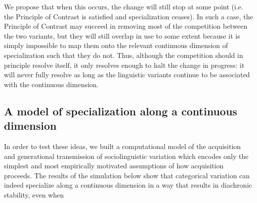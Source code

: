 We propose that when this occurs, the change will still stop at some point (i.e. the Principle of Contrast is satisfied and specialization ceases).
In such a case, the Principle of Contrast may succeed in removing most of the competition between the two variants, but they will still overlap in use to some extent because it is simply impossible to map them onto the relevant continuous dimension of specialization such that they do not.
Thus, although the competition should in principle resolve itself, it only resolves enough to halt the change in progress: it will never fully resolve as long as the linguistic variants continue to be associated with the continuous dimension.

\subsection{A model of specialization along a continuous dimension}

In order to test these ideas, we built a computational model of the acquisition and generational transmission of sociolinguistic variation which encodes only the simplest and most empirically motivated assumptions of how acquisition proceeds. The results of the simulation below show that categorical variation can indeed specialize along a continuous dimension in a way that results in diachronic stability, even when %






